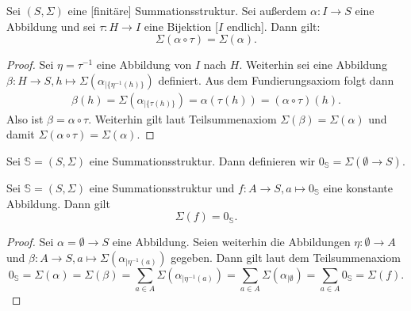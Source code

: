 \documentclass{article}
\begin{document}
\begin{theorem}
  Sei $(S, \Sigma)$ eine [finitäre] Summationsstruktur.
  Sei außerdem $\alpha \colon I \to S$ eine Abbildung 
  und sei $\tau \colon H \to I$ eine Bijektion [$I$ endlich].
  Dann gilt:
  \begin{equation*}
    \Sigma(\alpha \circ \tau) = \Sigma(\alpha).
  \end{equation*}
\end{theorem}
\begin{proof}
  Sei $\eta = \tau^{-1}$ eine Abbildung von $I$ nach $H$.
  Weiterhin sei eine Abbildung $\beta \colon H \to S, h \mapsto \Sigma(\alpha_{\mid \{\eta^{-1}(h) \}})$ definiert.
  Aus dem Fundierungsaxiom folgt dann 
  \begin{align*}
    \beta(h) = \Sigma(\alpha_{\mid \{ \tau(h) \}}) = \alpha(\tau(h)) = (\alpha \circ \tau)(h).
  \end{align*}
  Also ist $\beta = {\alpha \circ \tau}$.
  Weiterhin gilt laut Teilsummenaxiom $\Sigma(\beta) = \Sigma(\alpha)$ und damit $\Sigma({\alpha \circ \tau}) = \Sigma(\alpha)$.
\end{proof}

\begin{definition}
  Sei $\mathbb{S} = (S, \Sigma)$ eine Summationsstruktur.
  Dann definieren wir $0_\mathbb{S} = \Sigma(\emptyset \to S)$.
\end{definition}

\begin{theorem}\label{Theorem_SumStrukturNeutral}
  Sei $\mathbb{S} = (S, \Sigma)$ eine Summationsstruktur
  und $f \colon A \to S, a \mapsto 0_\mathbb{S}$ eine konstante Abbildung.
  Dann gilt
  \begin{equation*}
    \Sigma(f) = 0_\mathbb{S}.
  \end{equation*}
\end{theorem}
\begin{proof}
  Sei $\alpha = \emptyset \to S$ eine Abbildung.
  Seien weiterhin die Abbildungen
  $\eta \colon \emptyset \to A$
  und $\beta \colon A \to S, a \mapsto \Sigma(\alpha_{\mid \eta^{-1}(a)})$ gegeben.
  Dann gilt laut dem Teilsummenaxiom
  \begin{equation*}
    0_\mathbb{S}
    = \Sigma(\alpha)
    = \Sigma(\beta)
    = \sum_{a \in A} \Sigma(\alpha_{\mid \eta^{-1}(a)})
    = \sum_{a \in A} \Sigma(\alpha_{\mid \emptyset})
    = \sum_{a \in A} 0_\mathbb{S}
    = \Sigma(f).
  \end{equation*}
\end{proof}
\end{document}
